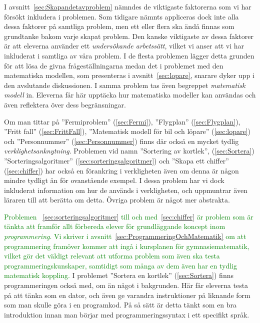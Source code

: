 \textcolor{lila}{I avsnitt~\ref{sec:Skapandetavproblem} nämndes de viktigaste faktorerna som vi har försökt inkludera i problemen. Som tidigare nämnts appliceras dock inte alla dessa faktorer på samtliga problem, men ett eller flera ska ändå finnas som grundtanke bakom varje skapat problem. Den kanske viktigaste av dessa faktorer är att eleverna använder ett \textsl{undersökande arbetssätt}, vilket vi anser att vi har inkluderat i samtliga av våra problem. I de flesta problemen lägger detta grunden för att lösa de givna frågeställningarna medan det i problemet med den matematiska modellen, som presenteras i avsnitt~\ref{sec:lopare}, snarare dyker upp i den avslutande diskussionen. I samma problem tas även begreppet \textsl{matematisk modell} in. Eleverna får här upptäcka hur matematiska modeller kan användas och även reflektera över dess begränsningar.} 

\textcolor{lila}{Om man tittar på ''Fermiproblem'' (\ref{sec:Fermi}), ''Flygplan'' (\ref{sec:Flygplan}), ''Fritt fall'' (\ref{sec:FrittFall}), ''Matematisk modell för bil och löpare'' (\ref{sec:lopare}) och ''Personnummer'' (\ref{sec:Personnummer}) finns där också en mycket tydlig \textsl{verklighetsanknytning}. Problemen vid namn ''Sortering av kortlek'', (\ref{sec:Sortera}) ''Sorteringsalgoritmer'' (\ref{sec:sorteringsalgoritmer}) och ''Skapa ett chiffer'' (\ref{sec:chiffer}) har också en förankring i verkligheten även om denna är någon mindre tydligt än för ovanstående exempel. I dessa problem har vi dock inkluderat information om hur de används i verkligheten, och uppmuntrar även läraren till att berätta om detta. Övriga problem är något mer abstrakta.}

\textcolor{green}{Problemen ~\ref{sec:sorteringsalgoritmer} till och med~\ref{sec:chiffer} är problem som är tänkta att framför allt förbereda elever för grundläggande koncept inom \textsl{programmering}. Vi skriver i avsnitt~\ref{sec:ProgrammeringOchMatematik} om att programmering framöver kommer att ingå i kursplanen för gymnasiematematik, vilket gör det väldigt relevant att utforma problem som även ska testa programmeringskunskaper, samtidigt som många av dem även har en tydlig matematisk koppling.} \textcolor{lila}{I problemet ''Sortera en kortlek'' (\ref{sec:Sortera}) finns programmeringen också med, om än något i bakgrunden. Här får eleverna testa på att tänka som en dator, och även ge varandra instruktioner på liknande form som man skulle göra i en programkod. På så sätt är detta tänkt som en bra introduktion innan man börjar med programmeringssyntax i ett specifikt språk.}

